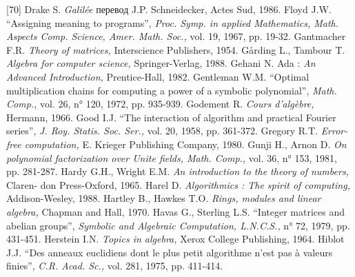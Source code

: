 \documentclass{../../template/mai_book}
\begin{document}
[70] Drake S. {\itshape Galil\'{e}e} перевод J.P. Schneidecker, Actes Sud, 1986. \newline
[71] Floyd J.W. “Assigning meaning to programs”, {\itshape Proc. Symp. in applied \newline Mathematics, Math. Aspects Comp. Science, Amer. Math. Soc.,} vol. 19, 1967, pp. 19-32. \newline
[72] Gantmacher F.R. {\itshape Theory of matrices,} Interscience Publishers, 1954. \newline
[73] G\aa rding L., Tambour T. {\itshape Algebra for computer science,} Springer-Verlag, 1988. \newline
\newpage
\noindent
[74] Gehani N. Ada : {\itshape An Advanced Introduction,} Prentice-Hall, 1982. \newline
[75] Gentleman W.M. “Optimal multiplication chains for computing a
power of a symbolic polynomial”, {\itshape Math. Comp.,} vol. 26, n° 120, 1972, pp. 935-939. \newline
[76] Godement R. {\itshape Cours d’alg\`{e}bre,} Hermann, 1966. \newline
[77] Good I.J. “The interaction of algorithm and practical Fourier series”, {\itshape J. Roy. Statis. Soc. Ser.,} vol. 20, 1958, pp. 361-372. \newline
[78] Gregory R.T. {\itshape Error-free computation,} E. Krieger Publishing Company, 1980. \newline
[79] Gunji H., Arnon D. {\itshape On polynomial factorization over Unite fields, Math. Comp.,} vol. 36, n° 153, 1981, pp. 281-287. \newline
[80] Hardy G.H., Wright E.M. {\itshape An introduction to the theory of numbers,} Claren- \newline don Press-Oxford, 1965. \newline
[81] Harel D. {\itshape Algorithmics : The spirit of computing,} Addison-Wesley, 1988. \newline
[82] Hartley B., Hawkes T.O. {\itshape Rings, modules and linear algebra,} Chapman and Hall, 1970. \newline
[83] Havas G., Sterling L.S. “Integer matrices and abelian groups”, {\itshape Symbolic and Algebraic Computation, L.N.C.S.,} n° 72, 1979, pp. 431-451. \newline
[84] Herstein I.N. {\itshape Topics in algebra,} Xerox College Publishing, 1964. \newline
[85] Hiblot J.J. “Des anneaux euclidiens dont le plus petit algorithme n’est
pas \`{a} valeurs finies”, {\itshape C.R. Acad. Sc.,} vol. 281, 1975, pp. 411-414. \newline
\end{document}

